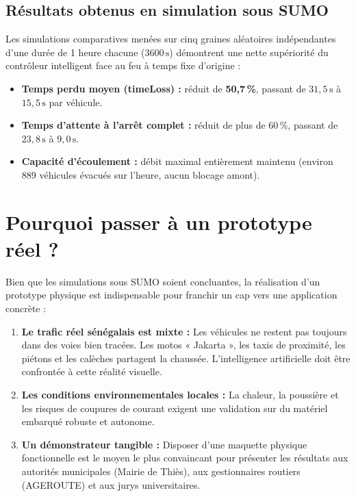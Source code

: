 \documentclass[11pt,a4paper]{article}
\begin{document}
\subsection{Résultats obtenus en simulation sous SUMO}
Les simulations comparatives menées sur cinq graines aléatoires indépendantes d'une durée de 1 heure chacune ($3600\,\mathrm{s}$) démontrent une nette supériorité du contrôleur intelligent face au feu à temps fixe d'origine :
\begin{itemize}[nosep]
    \item \textbf{Temps perdu moyen (timeLoss) :} réduit de \textbf{50{,}7\,\%}, passant de $31{,}5\,\mathrm{s}$ à $15{,}5\,\mathrm{s}$ par véhicule.
    \item \textbf{Temps d'attente à l'arrêt complet :} réduit de plus de $60\,\%$, passant de $23{,}8\,\mathrm{s}$ à $9{,}0\,\mathrm{s}$.
    \item \textbf{Capacité d'écoulement :} débit maximal entièrement maintenu (environ 889 véhicules évacués sur l'heure, aucun blocage amont).
\end{itemize}

\section{Pourquoi passer à un prototype réel ?}

Bien que les simulations sous SUMO soient concluantes, la réalisation d'un prototype physique est indispensable pour franchir un cap vers une application concrète :
\begin{enumerate}[nosep]
    \item \textbf{Le trafic réel sénégalais est mixte :} Les véhicules ne restent pas toujours dans des voies bien tracées. Les motos « Jakarta », les taxis de proximité, les piétons et les calèches partagent la chaussée. L'intelligence artificielle doit être confrontée à cette réalité visuelle.
    \item \textbf{Les conditions environnementales locales :} La chaleur, la poussière et les risques de coupures de courant exigent une validation sur du matériel embarqué robuste et autonome.
    \item \textbf{Un démonstrateur tangible :} Disposer d'une maquette physique fonctionnelle est le moyen le plus convaincant pour présenter les résultats aux autorités municipales (Mairie de Thiès), aux gestionnaires routiers (AGEROUTE) et aux jurys universitaires.
\end{enumerate}
\end{document}
